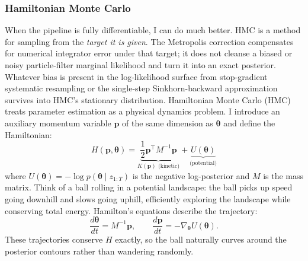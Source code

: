 \documentclass{article}
\renewcommand{\v}[1]{ \ensuremath{ {\mathbf{#1}} }}
\begin{document}
\subsubsection{Hamiltonian Monte Carlo}

When the pipeline is fully differentiable, I can do much better. HMC is a method for sampling from the \emph{target it is given}. The Metropolis correction compensates for numerical integrator error under that target; it does not cleanse a biased or noisy particle-filter marginal likelihood and turn it into an exact posterior. Whatever bias is present in the log-likelihood surface from stop-gradient systematic resampling or the single-step Sinkhorn-backward approximation survives into HMC's stationary distribution. Hamiltonian Monte Carlo (HMC) \cite{Duane1987,Neal-2012-MCMC-Hamiltonian-Dynamics-ARXIV-1206-1901v1} treats parameter estimation as a physical dynamics problem. I introduce an auxiliary momentum variable $\v p$ of the same dimension as $\v \theta$ and define the Hamiltonian:
\begin{equation}
    H(\v p, \v \theta) = \underbrace{\frac{1}{2}\v p^\top M^{-1} \v p}_{K(\v p) \text{ (kinetic)}} + \underbrace{U(\v \theta)}_{\text{(potential)}}
\end{equation}
where $U(\v \theta) = -\log p(\v \theta \mid z_{1:T})$ is the negative log-posterior and $M$ is the mass matrix. Think of a ball rolling in a potential landscape: the ball picks up speed going downhill and slows going uphill, efficiently exploring the landscape while conserving total energy. Hamilton's equations describe the trajectory:
\begin{equation}
    \frac{d\v \theta}{dt} = M^{-1}\v p, \qquad \frac{d\v p}{dt} = -\nabla_{\v \theta} U(\v \theta).
\end{equation}
These trajectories conserve $H$ exactly, so the ball naturally curves around the posterior contours rather than wandering randomly.
\end{document}
